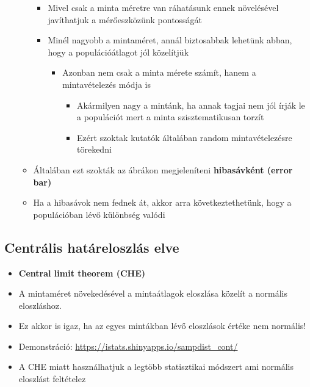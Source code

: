 \documentclass[
  letterpaper,
  DIV=11,
  numbers=noendperiod]{scrreprt}
\begin{document}
\begin{itemize}
\begin{itemize}
    \begin{itemize}
    \item
      Mivel csak a minta méretre van ráhatásunk ennek növelésével
      javíthatjuk a mérőeszközünk pontosságát
    \item
      Minél nagyobb a mintaméret, annál biztosabbak lehetünk abban, hogy
      a populációátlagot jól közelítjük

      \begin{itemize}
      \item
        Azonban nem csak a minta mérete számít, hanem a mintavételezés
        módja is

        \begin{itemize}
        \item
          Akármilyen nagy a mintánk, ha annak tagjai nem jól írják le a
          populációt mert a minta szisztematikusan torzít
        \item
          Ezért szoktak kutatók általában random mintavételezésre
          törekedni
        \end{itemize}
      \end{itemize}
    \end{itemize}
  \item
    Általában ezt szokták az ábrákon megjeleníteni \textbf{hibasávként
    (error bar)}
  \item
    Ha a hibasávok nem fednek át, akkor arra következtethetünk, hogy a
    populációban lévő különbség valódi
  \end{itemize}
\end{itemize}

\hypertarget{centruxe1lis-hatuxe1reloszluxe1s-elve}{%
\subsection{Centrális határeloszlás
elve}\label{centruxe1lis-hatuxe1reloszluxe1s-elve}}

\begin{itemize}
\item
  \textbf{Central limit theorem (CHE)}
\item
  A mintaméret növekedésével a mintaátlagok eloszlása közelít a normális
  eloszláshoz.
\item
  Ez akkor is igaz, ha az egyes mintákban lévő eloszlások értéke nem
  normális!
\item
  Demonstráció: \url{https://istats.shinyapps.io/sampdist_cont/}
\item
  A CHE miatt használhatjuk a legtöbb statisztikai módszert ami normális
  eloszlást feltételez
\end{itemize}
\end{document}

